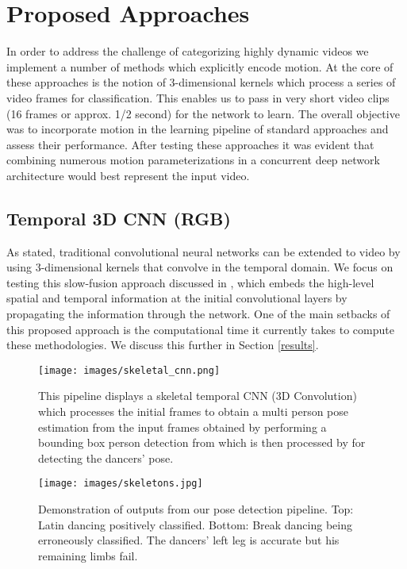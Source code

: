 \documentclass[10pt,twocolumn,letterpaper]{article}
\begin{document}
\section{Proposed Approaches}

In order to address the challenge of categorizing highly dynamic videos we implement a number of methods which explicitly encode motion. At the core of these approaches is the notion of 3-dimensional kernels which process a series of video frames for classification. This enables us to pass in very short video clips (16 frames or approx. 1/2 second) for the network to learn. The overall objective was to incorporate motion in the learning pipeline of standard approaches and assess their performance. After testing these approaches it was evident that combining numerous motion parameterizations in a concurrent deep network architecture would best represent the input video. 

\subsection{Temporal 3D CNN (RGB)} As stated, traditional convolutional neural networks can be extended to video by using 3-dimensional kernels that convolve in the temporal domain. We focus on testing this slow-fusion approach discussed in \cite{6165309}, which embeds the high-level spatial and temporal information at the initial convolutional layers by propagating the information through the network. One of the main setbacks of this proposed approach is the computational time it currently takes to compute these methodologies. We discuss this further in Section \ref{results}.

\begin{figure}[t]
\centering
\texttt{[image: images/skeletal\_cnn.png]}
\caption{This pipeline displays a skeletal temporal CNN (3D Convolution) which processes the initial frames to obtain a multi person pose estimation from the input frames obtained by performing a bounding box person detection from \cite{redmon2015you} which is then processed by \cite{wei2016convolutional} for detecting the dancers' pose.}
\label{fig:skeletal}
\end{figure}

\begin{figure}[t]
\centering
\texttt{[image: images/skeletons.jpg]}
\caption{Demonstration of outputs from our pose detection pipeline. Top: Latin dancing positively classified. Bottom: Break dancing being erroneously classified. The dancers' left leg is accurate but his remaining limbs fail.}
\label{fig:skeletons}
\end{figure}
\end{document}
